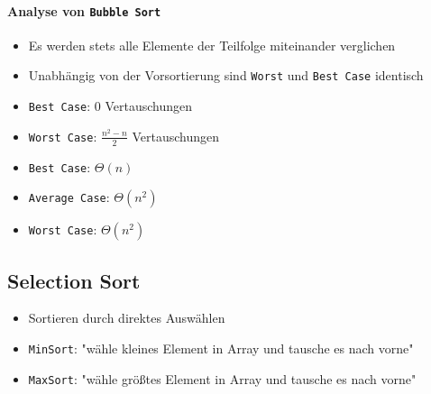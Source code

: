 \documentclass[
    ngerman,
    color=3b,
    dark_mode,
    load_common, %
    summary,
    boxarc,
]{tuda_summary}
\begin{document}
\paragraph{Analyse von \texttt{Bubble Sort}}
\begin{description}[leftmargin=5cm,itemsep=1em]
    \item [Anzahl der Vergleiche]
          \begin{itemize}
              \item Es werden stets alle Elemente der Teilfolge miteinander verglichen
              \item Unabhängig von der Vorsortierung sind \texttt{Worst} und \texttt{Best Case} identisch
          \end{itemize}

    \item [Anzahl der Vertauschungen]
          \begin{itemize}
              \item \texttt{Best Case}: 0 Vertauschungen
              \item \texttt{Worst Case}: $\frac{n^2-n}{2}$ Vertauschungen
          \end{itemize}

    \item [Komplexität]
          \begin{itemize}
              \item \texttt{Best Case}: $\Theta(n)$
              \item \texttt{Average Case}: $\Theta(n^2)$
              \item \texttt{Worst Case}: $\Theta(n^2)$
          \end{itemize}
\end{description}

\subsection{Selection Sort}\label{Selection sort}
\begin{idea}
    \begin{itemize}
        \item Sortieren durch direktes Auswählen
        \item \texttt{MinSort}: "wähle kleines Element in Array und tausche es nach vorne"
        \item \texttt{MaxSort}: "wähle grö\ss{}tes Element in Array und tausche es nach vorne"
    \end{itemize}
\end{idea}
\end{document}
